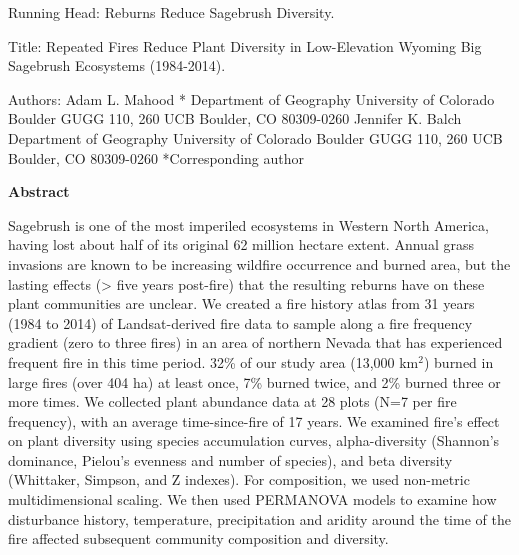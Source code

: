 \documentclass[12pt,]{article}
\title{}
\author{}
\date{}
\begin{document}
Running Head: Reburns Reduce Sagebrush Diversity.

Title: Repeated Fires Reduce Plant Diversity in Low-Elevation Wyoming
Big Sagebrush Ecosystems (1984-2014).

\vspace{5mm}

Authors:\newline
\newline
Adam L. Mahood *\newline
Department of Geography\newline
University of Colorado Boulder\newline
GUGG 110, 260 UCB\newline
Boulder, CO 80309-0260\newline
\newline
Jennifer K. Balch\newline
Department of Geography\newline
University of Colorado Boulder\newline
GUGG 110, 260 UCB \newline
Boulder, CO 80309-0260\newline
\newline
*Corresponding author\newline

\newpage

\linenumbers

\textbf{Abstract}

Sagebrush is one of the most imperiled ecosystems in Western North
America, having lost about half of its original 62 million hectare
extent. Annual grass invasions are known to be increasing wildfire
occurrence and burned area, but the lasting effects (\textgreater{} five
years post-fire) that the resulting reburns have on these plant
communities are unclear. We created a fire history atlas from 31 years
(1984 to 2014) of Landsat-derived fire data to sample along a fire
frequency gradient (zero to three fires) in an area of northern Nevada
that has experienced frequent fire in this time period. 32\% of our
study area (13,000 km\(^2\)) burned in large fires (over 404 ha) at
least once, 7\% burned twice, and 2\% burned three or more times. We
collected plant abundance data at 28 plots (N=7 per fire frequency),
with an average time-since-fire of 17 years. We examined fire's effect
on plant diversity using species accumulation curves, alpha-diversity
(Shannon's dominance, Pielou's evenness and number of species), and beta
diversity (Whittaker, Simpson, and Z indexes). For composition, we used
non-metric multidimensional scaling. We then used PERMANOVA models to
examine how disturbance history, temperature, precipitation and aridity
around the time of the fire affected subsequent community composition
and diversity.
\end{document}
